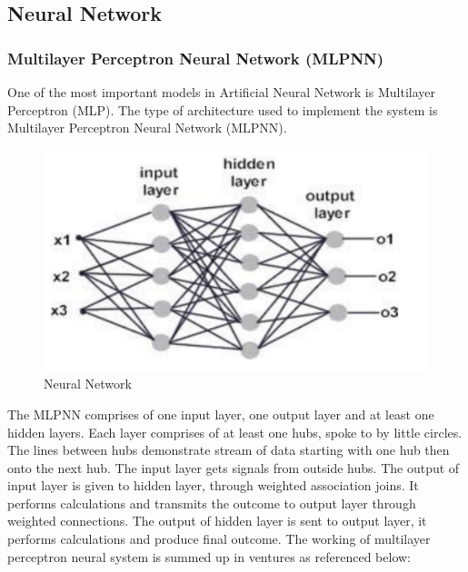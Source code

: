 \documentclass[oneside,12pt]{Classes/VTU}
\begin{document}
  		\subsection{Neural Network}
  		\subsubsection{Multilayer Perceptron Neural Network (MLPNN)}
  		One of the most important models in Artificial Neural Network is Multilayer Perceptron
  		(MLP). The  type of architecture  used to  implement  the system  is Multilayer Perceptron Neural Network (MLPNN).
  		\begin{figure}[H]
  			\begin{center}
  				\includegraphics[width=12cm]{images/mlpnn.png}
  				\caption{Neural Network}
  			\end{center}
  		\end{figure}
  		The MLPNN comprises of one input layer, one output layer and at least one hidden layers. Each layer comprises of at least one hubs, spoke to by little circles. The lines between hubs demonstrate stream of data starting with one hub then onto the next hub. The input layer gets signals from outside hubs. The output of input layer is given to hidden layer, through weighted association joins. It performs calculations and transmits the outcome to output layer through weighted connections. The output of hidden layer is sent to output layer, it performs calculations and produce final outcome. The working of multilayer perceptron neural system is summed up in ventures as referenced below:
\end{document}
